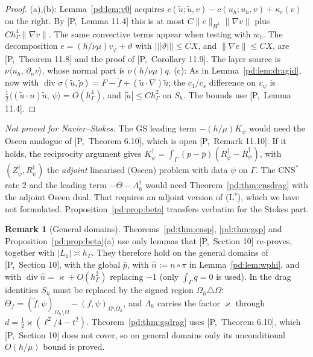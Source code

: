 \documentclass[11pt,reqno]{amsart}
\theoremstyle{plain}
\theoremstyle{definition}
\newtheorem{remark}[theorem]{Remark}
\newcommand{\hG}{h_\Gamma}
\newcommand{\Oh}{\Omega_h}
\newcommand{\dn}{\partial_n}
\newcommand{\ut}{\tilde u}
\newcommand{\pt}{\tilde p}
\newcommand{\ft}{\tilde f}
\newcommand{\pbar}{\bar p}
\newcommand{\ip}[2]{\langle #1,\, #2\rangle}
\newcommand{\tnorm}[1]{|\!|\!|#1|\!|\!|}
\newcommand{\norm}[1]{\lVert #1\rVert}
\newcommand{\GS}{\mathrm{GS}}
\newcommand{\CNS}{\mathrm{CNS}^\ast}
\renewcommand{\div}{\operatorname{div}}
\newcommand{\Pref}[1]{\textup{[P,~#1]}}
\newcommand{\Lay}{L_1}
\newcommand{\kap}{\varkappa}
\begin{document}
\begin{proof}
(a),(b): Lemma~\ref{pd:lem:v0} acquires $c(\ut;\ut,v)-c(u_h;u_h,v)+\kappa_c(v)$ on the right. By \Pref{Lemma 11.4} this is at most $C\norm e_{H^1}\norm{\nabla v}$ plus $C\hG^4\norm{\nabla v}$. The same convective terms appear when testing with $w_1$. The decomposition $e=(h/\nu\mu)v_\varphi+\vartheta$ with $\tnorm\vartheta\le CX$, and $\norm{\nabla e}\le CX$, are \Pref{Theorem 11.8} and the proof of \Pref{Corollary 11.9}. The layer source is $\nu\ip{u_h}{\dn v}$, whose normal part is $\nu(h/\nu\mu)q$. (c): As in Lemma~\ref{pd:lem:dragid}, now with $\div\sigma(\ut,\pt)=F-\ft+(\ut\cdot\nabla)\ut$; the $c_1$/$c_s$ difference on $v_\psi$ is $\frac12\ip{(\ut\cdot n)\ut}\psi=O(\hG^4)$, and $|\ut|\le C\hG^2$ on $S_h$. The bounds use \Pref{Lemma 11.4}.
\end{proof}

\emph{Not proved for Navier--Stokes.} The $\GS$ leading term $-(h/\mu)K_\psi$ would need the Oseen analogue of \Pref{Theorem 6.10}, which is open \Pref{Remark 11.10}. If it holds, the reciprocity argument gives $K^\dagger_\psi=\int_\Gamma(p-\pbar)(R^\dagger_\psi-\bar R^\dagger_\psi)$, with $(Z^\dagger_\psi,R^\dagger_\psi)$ the \emph{adjoint} linearised (Oseen) problem with data $\psi$ on $\Gamma$. The $\CNS$ rate $2$ and the leading term $-\Theta-\Lambda^\dagger_h$ would need Theorem~\ref{pd:thm:cnsdrag} with the adjoint Oseen dual. That requires an adjoint version of (L$^\ast$), which we have not formulated. Proposition~\ref{pd:prop:beta} transfers verbatim for the Stokes part.

\begin{remark}[General domains]\label{pd:rem:gd}
Theorems~\ref{pd:thm:cnsp}, \ref{pd:thm:gsp} and Proposition~\ref{pd:prop:beta}(a) use only lemmas that \Pref{Section 10} re-proves, together with $|\Lay|\asymp\hG$. They therefore hold on the general domains of \Pref{Section 10}, with the global $\pbar$, with $\hat n:=n\circ\pi$ in Lemma~\ref{pd:lem:wphi}, and with $\div\hat n=\kap+O(\hG^2)$ replacing $-1$ (only $\int_\Gamma q=0$ is used). In the drag identities $S_h$ must be replaced by the signed region $\Oh\triangle\Omega$: $\Theta_f=(\ft,\psi)_{\Oh\setminus\Omega}-(f,\psi)_{\Omega\setminus\Oh}$, and $\Lambda_h$ carries the factor $\kap$ through $d=\frac12\kap(\ell^2/4-t^2)$. Theorem~\ref{pd:thm:gsdrag} uses \Pref{Theorem 6.10}, which \Pref{Section 10} does not cover, so on general domains only its unconditional $O(h/\mu)$ bound is proved.
\end{remark}
\end{document}
